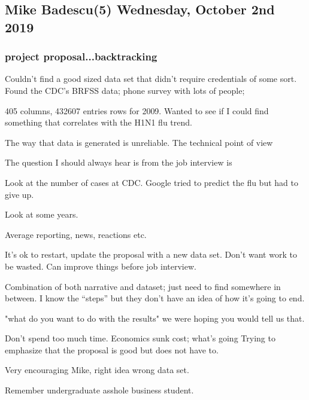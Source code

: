 \subsection{Mike Badescu(5) Wednesday, October 2nd 2019}

\subsubsection{project proposal...backtracking}

Couldn't find a good sized data set that didn't require
credentials of some sort.
Found the CDC's BRFSS data; phone survey with
lots of people;

405 columns, 432607 entries rows for 2009. 
Wanted to see if I could find something that
correlates with the H1N1 flu trend.

The way that data is generated
is unreliable. The technical point
of view

The question I should always hear is
from the job interview is 

Look at the number of cases at CDC.
Google tried to predict the flu
but had to give up.

Look at some years.

Average reporting, news, reactions etc.

It's ok to restart, update the proposal
with a new data set.
Don't want work to be wasted. Can
improve things before job interview. 

Combination of both narrative and dataset;
just need to find somewhere in between.
I know the ``steps'' but they don't have an idea of
how it's going to end.

"what do you want to do with the results"
we were hoping you would tell us that.

Don't spend too much time.
Economics sunk cost; what's going
Trying to emphasize that the proposal is
good but does not have to. 

Very encouraging Mike, right idea wrong data
set.

Remember undergraduate asshole business student.

